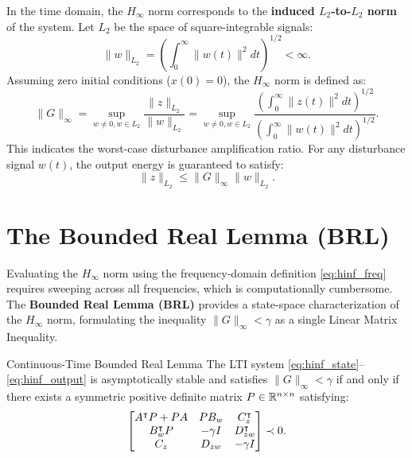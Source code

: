 In the time domain, the $H_\infty$ norm corresponds to the \textbf{induced $L_2$-to-$L_2$ norm} of the system. Let $L_2$ be the space of square-integrable signals:
\begin{equation}
\| w \|_{L_2} = \left( \int_0^\infty \| w(t) \|^2 dt \right)^{1/2} < \infty .
\end{equation}
Assuming zero initial conditions ($x(0) = 0$), the $H_\infty$ norm is defined as:
\begin{equation}
    \| G \|_\infty = \sup_{w \neq 0, w \in L_2} \frac{\| z \|_{L_2}}{\| w \|_{L_2}} = \sup_{w \neq 0, w \in L_2} \frac{\left( \int_0^\infty \| z(t) \|^2 dt \right)^{1/2}}{\left( \int_0^\infty \| w(t) \|^2 dt \right)^{1/2}} . \label{eq:hinf_time}
\end{equation}
This indicates the worst-case disturbance amplification ratio. For any disturbance signal $w(t)$, the output energy is guaranteed to satisfy:
\begin{equation}
\| z \|_{L_2} \le \| G \|_\infty \| w \|_{L_2} .
\end{equation}

\section{The Bounded Real Lemma (BRL)}
Evaluating the $H_\infty$ norm using the frequency-domain definition \eqref{eq:hinf_freq} requires sweeping across all frequencies, which is computationally cumbersome. The \textbf{Bounded Real Lemma (BRL)} provides a state-space characterization of the $H_\infty$ norm, formulating the inequality $\| G \|_\infty < \gamma$ as a single Linear Matrix Inequality.

\begin{mytheorem}{Continuous-Time Bounded Real Lemma}
The LTI system \eqref{eq:hinf_state}--\eqref{eq:hinf_output} is asymptotically stable and satisfies $\| G \|_\infty < \gamma$ if and only if there exists a symmetric positive definite matrix $P \in \mathbb{R}^{n \times n}$ satisfying:
\begin{equation}
    \begin{bmatrix} A^\intercal P + P A & P B_w & C_z^\intercal \\ B_w^\intercal P & -\gamma I & D_{zw}^\intercal \\ C_z & D_{zw} & -\gamma I \end{bmatrix} \prec 0 . \label{eq:brl_lmi}
\end{equation}
\end{mytheorem}

